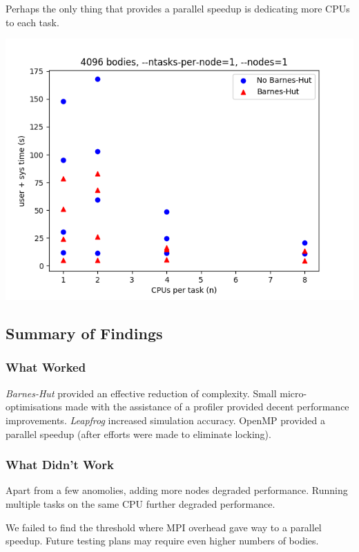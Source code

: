\documentclass[11pt,a4paper]{article}
\begin{document}
Perhaps the only thing that provides a parallel speedup is dedicating more CPUs to each task.

\includegraphics[width=14.2cm]{scaling}

\subsection*{Summary of Findings}

\subsubsection*{What Worked}

\textit{Barnes-Hut} provided an effective reduction of complexity. Small micro-optimisations made with the assistance of a profiler provided decent performance improvements. \textit{Leapfrog} increased simulation accuracy. OpenMP provided a parallel speedup (after efforts were made to eliminate locking).

\subsubsection*{What Didn't Work}

 Apart from a few anomolies, adding more nodes degraded performance. Running multiple tasks on the same CPU further degraded performance. 

We failed to find the threshold where MPI overhead gave way to a parallel speedup. Future testing plans may require even higher numbers of bodies.
\end{document}
